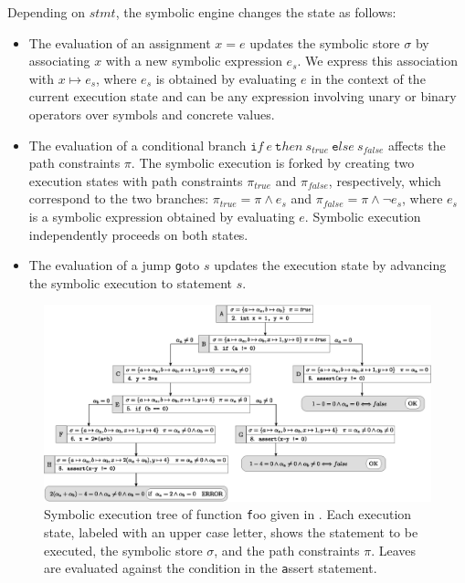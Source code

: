 \noindent Depending on $stmt$, the symbolic engine changes the state as follows:

\begin{itemize}
	\item The evaluation of an assignment $x=e$ updates the symbolic store $\sigma$ by associating $x$ with a new symbolic expression $e_s$. We express this association with $x\mapsto e_s$, where $e_s$ is obtained by evaluating $e$ in the context of the current execution state and  can be any expression involving unary or binary operators over symbols and concrete values.
	\item The evaluation of a conditional branch ${\texttt if}~e~{\texttt then}~s_{true}~{\texttt else}~s_{false}$ affects the path constraints $\pi$. The symbolic execution is forked by creating two execution states with path constraints $\pi_{true}$ and $\pi_{false}$, respectively, which correspond to the two branches: $\pi_{true}=\pi \wedge e_s$ and $\pi_{false}=\pi \wedge \neg e_s$, where $e_s$ is a symbolic expression obtained by evaluating $e$. 
	Symbolic execution independently proceeds on both states.
	\item The evaluation of a jump {\texttt goto} $s$ updates the execution state by advancing the symbolic execution to statement $s$. 
\end{itemize}

\begin{figure}[t]
	\centering
	\includegraphics[width=0.975\columnwidth]{images/execution-tree.eps} 
	\caption{Symbolic execution tree of function {\texttt foo} given in . Each execution state, labeled with an upper case letter, shows the statement to be executed, the symbolic store $\sigma$, and the path constraints $\pi$. Leaves are evaluated against the condition in the {\texttt assert} statement. }
	\label{fig:example-symbolic-execution}
	\vspace{-1mm}
\end{figure}

